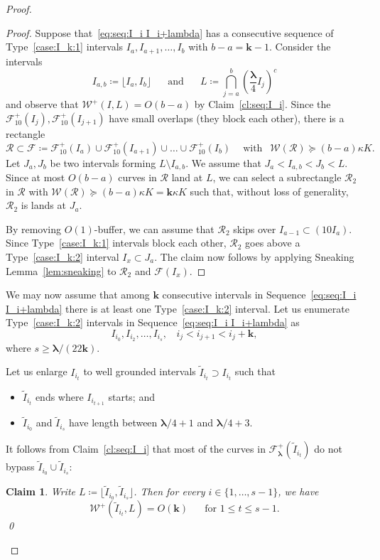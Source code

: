 \documentclass{amsart}
\renewcommand{\sp}{{\ \ }}
\newcommand{\1}{{\mathbb 1 }}
\newcommand{\blambda}{{\boldsymbol\lambda}}
\newcommand{\Fam}{{\mathcal F}}
\newcommand{\Width}{{\mathcal W}}
\newcommand\RR{\mathcal{R}}
\newcommand{\bbk}{{\mathbf k}}
\newtheorem{claim}{Claim}
\theoremstyle{remark}
\numberwithin{equation}{section}
\theoremstyle{definition}
\begin{document}
\begin{proof}
\begin{proof}
Suppose that~\eqref{eq:seq:I_i  I_i+lambda} has a consecutive sequence of Type~\eqref{case:I_k:1} intervals $I_a,I_{a+1},\dots, I_b$ with $b-a= \bbk -1$. Consider the intervals 
\[ I_{a,b}\coloneqq \lfloor I_a, I_b\rfloor\sp\sp\sp \text{ and }\sp\sp\sp L\coloneqq \bigcap_{j=a}^b \left(\frac \blambda 4 I_j \right)^c\]
and observe that $\Width^+(I, L)= O(b-a)$ by Claim~\ref{cl:seq:I_i}. Since the $\Fam^+_{10}(I_j), \Fam^+_{10}(I_{j+1})$ have small overlaps (they block each other), there is a rectangle \[  \RR \subset \Fam\coloneqq \Fam^+_{10}(I_a)\cup \Fam^+_{10}(I_{a+1})\cup \dots \cup \Fam^+_{10}(I_b) \sp\sp\text{ with }\sp \Width(\RR)\succeq (b-a)\kappa K.\]
Let $J_a,J_b$ be two intervals forming $L\setminus I_{a,b}$. We assume that $J_a<I_{a,b}<J_b< L$. Since at most $O(b-a)$ curves in $\RR$ land at $L$, we can select a subrectangle $\RR_2$ in $\RR$ with $\Width(\RR)\succeq (b-a)\kappa K=\bbk \kappa K$ such that, without loss of generality, $\RR_2$ is lands at $J_a$.


By removing $O(1)$-buffer, we can assume that $\RR_2$ skips over $I_{a-1}\subset (10I_a)$. Since Type~\eqref{case:I_k:1} intervals block each other, $\RR_2$ goes above a  Type~\eqref{case:I_k:2} interval $I_x\subset J_a$. The claim now follows by applying Sneaking Lemma~\ref{lem:sneaking} to $\RR_2$ and $\Fam(I_x)$.
\end{proof}



We may now assume that among 
$\bbk$ consecutive intervals in Sequence~\eqref{eq:seq:I_i  I_i+lambda} there is at least one Type~\eqref{case:I_k:2} interval. Let us enumerate Type~\eqref{case:I_k:2} intervals in Sequence~\eqref{eq:seq:I_i  I_i+lambda} as
\[I_{i_0},I_{i_2},\dots ,I_{i_{s}},\sp\sp i_j<i_{j+1}<i_j + \bbk,\]
where $s \ge \blambda/(22\bbk).$

Let us enlarge $I_{i_t}$ to well grounded intervals $\widetilde I_{i_t}\supset I_{i_t}$ such that
\begin{itemize}
\item $\widetilde I_{i_t}$ ends where $ I_{i_{t+1}}$ starts; and
\item $\widetilde I_{i_0}$ and $\widetilde I_{i_s}$ have length between $\blambda/4+1$ and $\blambda/4+3$.
\end{itemize} 



It follows from Claim~\ref{cl:seq:I_i} that most of the curves in $\Fam^+_\blambda (\widetilde I_{i_t})$ do not bypass $\widetilde I_{i_0}\cup \widetilde I_{i_s}$:
\begin{claim}
Write $L\coloneqq \lfloor \widetilde I_{i_0},  \widetilde I_{i_s}\rfloor $. Then for every $i\in \{1,\dots, s-1\}$, we have
 \[  \Width^+(\widetilde I_{i_t}, L) =O(\bbk) \sp\sp\sp\text{ for } 1\le t\le s-1.\]
\qed
\end{claim}


\end{proof}
\end{document}
